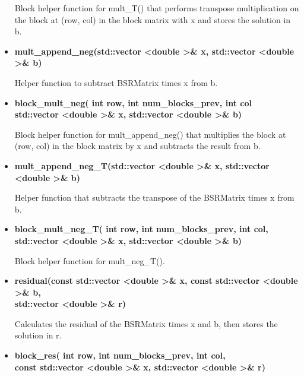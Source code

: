 \documentclass{article}
\newcommand\tab[1][1cm]{\hspace*{#1}}
\begin{document}
\begin{itemize}
            Block helper function for mult\_T() that performs transpose multiplication
            on the block at (row, col) in the block matrix with x and stores the
            solution in b.
                
        \item \textbf{mult\_append\_neg(std::vector \textless double \textgreater\& x, 
                std::vector \textless double \textgreater\& b)}
                
            Helper function to subtract BSRMatrix times x from b.
                
        \item \textbf{block\_mult\_neg( int row, int num\_blocks\_prev, int col \\
            \tab std::vector \textless double \textgreater\& x, 
                 std::vector \textless double \textgreater\& b)}
                
            Block helper function for mult\_append\_neg() that multiplies the block
            at (row, col) in the block matrix by x and subtracts the result from b.
                
        \item \textbf{mult\_append\_neg\_T(std::vector \textless double \textgreater\& x, 
                std::vector \textless double \textgreater\& b)}
                
            Helper function that subtracts the transpose of the BSRMatrix times x
            from b.
                
        \item \textbf{block\_mult\_neg\_T( int row, int num\_blocks\_prev, int col, \\
            \tab std::vector \textless double \textgreater\& x, 
                 std::vector \textless double \textgreater\& b)}
                
            Block helper function for mult\_neg\_T().
                
        \item \textbf{residual(const std::vector \textless double \textgreater\& x, 
                const std::vector \textless double \textgreater\& b, \\
                \tab std::vector \textless double \textgreater\& r)}
        
            Calculates the residual of the BSRMatrix times x and b, then stores the
            solution in r.
        
        \item \textbf{block\_res( int row, int num\_blocks\_prev, int col, \\
            \tab const std::vector \textless double \textgreater\& x, 
                 std::vector \textless double \textgreater\& r)}
                

\end{itemize}
\end{document}
